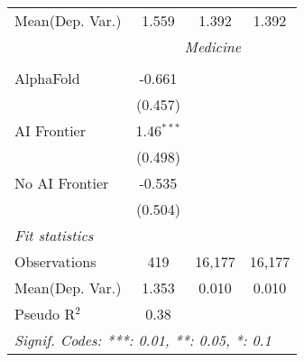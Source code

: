 \begin{tabular}{lccc}
Mean(Dep. Var.) & 1.559 & 1.392 & 1.392 \\
 & \multicolumn{3}{c}{\textit{Medicine}} \\ \\
   AlphaFold      & -0.661       &        &   \\   
                  & (0.457)      &        &   \\   
   AI Frontier    & 1.46$^{***}$ &        &   \\   
                  & (0.498)      &        &   \\   
   No AI Frontier & -0.535       &        &   \\   
                  & (0.504)      &        &   \\   
   \midrule
   \emph{Fit statistics}\\
   Observations   & 419          & 16,177 & 16,177\\  
Mean(Dep. Var.) & 1.353 & 0.010 & 0.010 \\
   Pseudo R$^2$   & 0.38         &        & \\  
   \midrule \midrule
   \multicolumn{4}{l}{\emph{Signif. Codes: ***: 0.01, **: 0.05, *: 0.1}}\\
\end{tabular}
\par\endgroup
